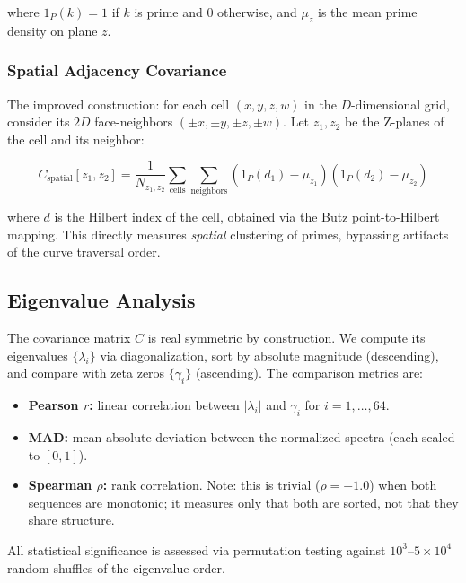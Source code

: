 \documentclass[11pt,a4paper]{article}
\begin{document}
where $1_P(k) = 1$ if $k$ is prime and $0$ otherwise, and $\mu_z$ is the
mean prime density on plane $z$.

\subsubsection{Spatial Adjacency Covariance}

The improved construction: for each cell $(x,y,z,w)$ in the $D$-dimensional
grid, consider its $2D$ face-neighbors $(\pm x, \pm y, \pm z, \pm w)$. Let
$z_1, z_2$ be the Z-planes of the cell and its neighbor:

\begin{equation}
C_{\text{spatial}}[z_1, z_2] = \frac{1}{N_{z_1,z_2}} \sum_{\text{cells}}
\sum_{\text{neighbors}} (1_P(d_1) - \mu_{z_1})(1_P(d_2) - \mu_{z_2})
\end{equation}

where $d$ is the Hilbert index of the cell, obtained via the Butz
point-to-Hilbert mapping. This directly measures \emph{spatial} clustering
of primes, bypassing artifacts of the curve traversal order.

\subsection{Eigenvalue Analysis}

The covariance matrix $C$ is real symmetric by construction. We compute its
eigenvalues $\{\lambda_i\}$ via diagonalization, sort by absolute magnitude
(descending), and compare with zeta zeros $\{\gamma_i\}$ (ascending). The
comparison metrics are:

\begin{itemize}
\item \textbf{Pearson $r$:} linear correlation between $|\lambda_i|$ and
   $\gamma_i$ for $i = 1,\ldots,64$.
\item \textbf{MAD:} mean absolute deviation between the normalized spectra
   (each scaled to $[0, 1]$).
\item \textbf{Spearman $\rho$:} rank correlation. Note: this is trivial
   ($\rho = -1.0$) when both sequences are monotonic; it measures only
   that both are sorted, not that they share structure.
\end{itemize}

All statistical significance is assessed via permutation testing against
$10^3$--$5 \times 10^4$ random shuffles of the eigenvalue order.

\end{document}
